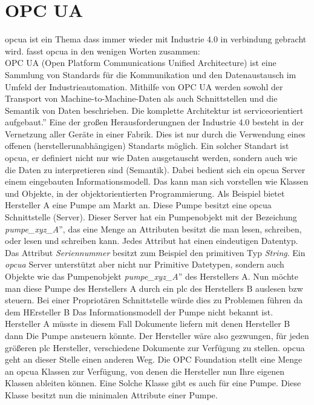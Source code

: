 \section{OPC UA}
\ac{opcua} ist ein Thema dass immer wieder mit Industrie 4.0 in verbindung gebracht wird.
\citet{opcua:2018} fasst \acs{opcua} in den wenigen  Worten zusammen:\\
\glqq{}OPC UA (Open Platform Communications Unified Architecture) ist eine Sammlung von Standards 
für die Kommunikation und den Datenaustausch im Umfeld der Industrieautomation. 
Mithilfe von OPC UA werden sowohl der Transport von Machine-to-Machine-Daten 
als auch Schnittstellen und die Semantik von Daten beschrieben. 
Die komplette Architektur ist serviceorientiert aufgebaut.''
Eine der großen Herausforderungnen der Industrie 4.0 besteht in der Vernetzung aller Geräte in einer Fabrik.
Dies ist nur durch die Verwendung eines offenen (herstellerunabhängigen) Standarts möglich.
Ein solcher Standart ist \ac{opcua}, er definiert nicht nur wie Daten ausgetauscht werden, 
sondern auch wie die Daten zu interpretieren sind (Semantik).
Dabei bedient sich ein \ac{opcua} Server einem eingebauten Informationsmodell. 
Das kann man sich vorstellen wie Klassen und Objekte, in der objektorientierten Programmierung.
Als Beispiel bietet Hersteller A eine Pumpe am Markt an. 
Diese Pumpe besitzt eine \ac{opcua} Schnittstelle (Server).
Dieser Server hat ein Pumpenobjekt mit der Bezeichung \glqq{}\emph{pumpe\_xyz\_A}'', das eine Menge an Attributen besitzt die man lesen, schreiben, oder lesen und schreiben kann.
Jedes Attribut hat einen eindeutigen Datentyp. 
Das Attribut \emph{Seriennummer} besitzt zum Beispiel den primitiven Typ \emph{String}.
Ein \emph{opcua} Server unterstützt aber nicht nur Primitive Datetypen, 
sondern auch Objekte wie das Pumpenobjekt \glqq{}\emph{pumpe\_xyz\_A}'' des Herstellers A.
Nun möchte man diese Pumpe des Herstellers A durch ein \ac{plc} des Herstellers B auslesen bzw steuern.
Bei einer Propriotären Schnittstelle würde dies zu Problemen führen da dem HErsteller B Das Informationsmodell der Pumpe nicht bekannt ist. 
Hersteller A müsste in diesem Fall Dokumente liefern mit denen Hersteller B dann Die Pumpe ansteuern könnte.
Der Hersteller wäre also gezwungen, für jeden größeren \ac{plc} Hersteller, verschiedene Dokumente zur Verfügung zu stellen.
\ac{opcua} geht an dieser Stelle einen anderen Weg. 
Die OPC Foundation stellt eine Menge an \ac{opcua} Klassen zur Verfügung, 
von denen die Hersteller nun Ihre eigenen Klassen ableiten können.
Eine Solche Klasse gibt es auch für eine Pumpe. Diese Klasse besitzt nun die minimalen Attribute einer Pumpe.
